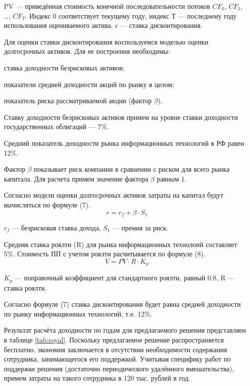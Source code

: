 PV --- приведённая стоимость конечной последовательности потоков $CF_0$, $CF_1$, \ldots , $CF_T$. Индекс 0 соответствует текущему году, индекс Т --- последнему году использования оцениваемого актива. r --- ставка дисконтирования.

Для оценки ставки дисконтирования воспользуемся моделью оценки долгосрочных активов. Для ее построения необходимы:
\begin{list}{}{\leftmargin=1.5cm}
	\item ставка доходности безрисковых активов;
	\item показатели средней доходности акций по рынку в целом;
	\item показатель риска рассматриваемой акции (фактор $\beta$).
\end{list}

Ставку доходности безрисковых активов примем на уровне ставки доходности государственных облигаций --- 7\%.

Средний показатель доходности рынка информационных технологий в РФ равен 12\%.

Фактор $\beta$ показывает риск компании в сравнении с риском для всего рынка капитала. Для расчета примем значение фактора $\beta$ равным 1.

Согласно модели оценки долгосрочных активов затраты на капитал будут вычисляться по формуле (7).
\begin{equation}
	r = r_f + \beta\cdot S_1
\end{equation}

$r_f$ --- безрисковая ставка дохода, $S_1$ --- премия за риск.

Средняя ставка роялти (R) для рынка информационных технолоий составляет 5\%. Стоимость ПП с учетом роялти расчитывается по формуле (8).
\begin{equation}
	V = PV \cdot R \cdot K_p
\end{equation}

$K_p$ --- поправочный коэффициент для стандартного роялти, равный 0.8, R --- ставка роялти.

Согласно формуле (7) ставка дисконтирования будет равна средней доходности по рынку информационных технологий, т.е. 12\%.

Результат расчёта доходности по годам для предлагаемого решения представляен в таблице \ref{tab:royal}. Поскольку предлагаемое решение распространяется бесплатно, экономия заключается в отсутствии необходимости содержания сотрудника, занимающегося его поддержкой. Учитывая специфику работ по поддержке решения (достаточно периодического удалённого вмешательства), примем затраты на такого сотрудника в 120 тыс. рублей в год.

